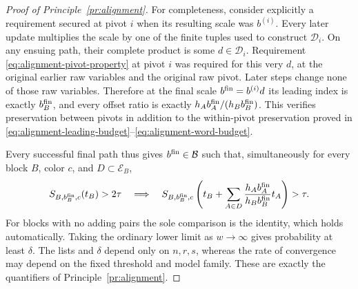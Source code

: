 \begin{proof}[Proof of Principle~\ref{pr:alignment}]
For completeness, consider explicitly a requirement secured at
pivot $i$ when its resulting scale was $b^{(i)}$.  Every later
update multiplies the scale by one of the finite tuples used to
construct $\mathcal D_i$.  On any ensuing path, their complete
product is some $d\in\mathcal D_i$.  Requirement
\eqref{eq:alignment-pivot-property} at pivot $i$ was required
for this very $d$, at the original earlier raw variables and
the original raw pivot.  Later steps change none of those raw
variables.  Therefore at the final scale
$b^{\rm fin}=b^{(i)}d$ its leading index is exactly
$b^{\rm fin}_B$, and every offset ratio is exactly
$h_A b^{\rm fin}_A/(h_B b^{\rm fin}_B)$.
This verifies preservation between pivots in addition to the
within-pivot preservation proved in
\eqref{eq:alignment-leading-budget}--\eqref{eq:alignment-word-budget}.

Every successful final path thus gives $b^{\rm fin}\in\mathcal B$
such that, simultaneously for every block $B$, color $c$, and
$D\subset\mathcal E_B$,
\[
 S_{B,b^{\rm fin}_B,c}(t_B)>2\tau
 \quad\Longrightarrow\quad
 S_{B,b^{\rm fin}_B,c}\left(t_B+
       \sum_{A\in D}\frac{h_A b^{\rm fin}_A}
                             {h_B b^{\rm fin}_B}t_A\right)>\tau.
\]
For blocks with no adding pairs the sole comparison is the
identity, which holds automatically.  Taking the ordinary lower
limit as $w\to\infty$ gives probability at least $\delta$.
The lists and $\delta$ depend only on $n,r,s$, whereas the rate
of convergence may depend on the fixed threshold and model
family.  These are exactly the quantifiers of
Principle~\ref{pr:alignment}.
\end{proof}

